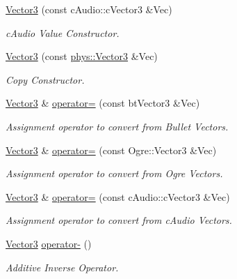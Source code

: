 \begin{DoxyCompactItemize}
\hyperlink{classphys_1_1Vector3_a9f0f452baf92e0c10e6eb0944dc2b3d3}{Vector3} (const cAudio::cVector3 \&Vec)
\begin{DoxyCompactList}\small\item\em cAudio Value Constructor. \item\end{DoxyCompactList}\item 
\hyperlink{classphys_1_1Vector3_ac22e136942a20df0129ef166f6fafb87}{Vector3} (const \hyperlink{classphys_1_1Vector3}{phys::Vector3} \&Vec)
\begin{DoxyCompactList}\small\item\em Copy Constructor. \item\end{DoxyCompactList}\item 
\hyperlink{classphys_1_1Vector3}{Vector3} \& \hyperlink{classphys_1_1Vector3_a6bf00999b090258a0acb96368aa1bf38}{operator=} (const btVector3 \&Vec)
\begin{DoxyCompactList}\small\item\em Assignment operator to convert from Bullet Vectors. \item\end{DoxyCompactList}\item 
\hyperlink{classphys_1_1Vector3}{Vector3} \& \hyperlink{classphys_1_1Vector3_a666d681f28de675cb45c4772a7d4a3ad}{operator=} (const Ogre::Vector3 \&Vec)
\begin{DoxyCompactList}\small\item\em Assignment operator to convert from Ogre Vectors. \item\end{DoxyCompactList}\item 
\hyperlink{classphys_1_1Vector3}{Vector3} \& \hyperlink{classphys_1_1Vector3_aef23e947ca4e3f24a34ccbcb412d24b5}{operator=} (const cAudio::cVector3 \&Vec)
\begin{DoxyCompactList}\small\item\em Assignment operator to convert from cAudio Vectors. \item\end{DoxyCompactList}\item 
\hyperlink{classphys_1_1Vector3}{Vector3} \hyperlink{classphys_1_1Vector3_afb86ac7edd78353ec3d11d9f2efdf0cb}{operator-\/} ()
\begin{DoxyCompactList}\small\item\em Additive Inverse Operator. \item\end{DoxyCompactList}\item 

\end{DoxyCompactItemize}
